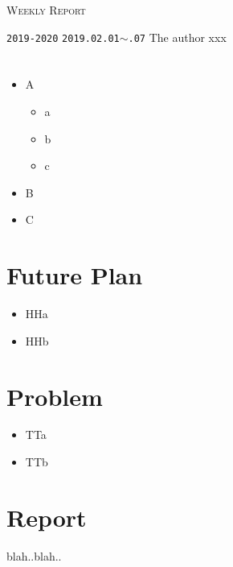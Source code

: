 \documentclass{scrartcl}
\begin{document}
\title{}
\date{}
\maketitle
\vspace{-22ex}

\begin{flushleft}
{\huge \textsc{Weekly Report}}
\vspace{4ex}

\texttt{2019-2020}  \hspace{1.5cm} \texttt{2019.02.01\;$\sim$.07} \hfill The author xxx
\vspace{-3ex}
\end{flushleft}
\vspace{-4ex}

\section{}
\begin{itemize}
\item A
  \begin{itemize}
  \item a
  \item b
  \item c
  \end{itemize}
\item B
\item C
\end{itemize}
  
\section{\geo Future Plan}
\begin{itemize}
\item HHa
\item HHb
\end{itemize}
  
\section{\geo Problem}
\begin{itemize}
\item TTa
\item TTb
\end{itemize}
\section{\geo Report}
blah..blah..
\end{document}
